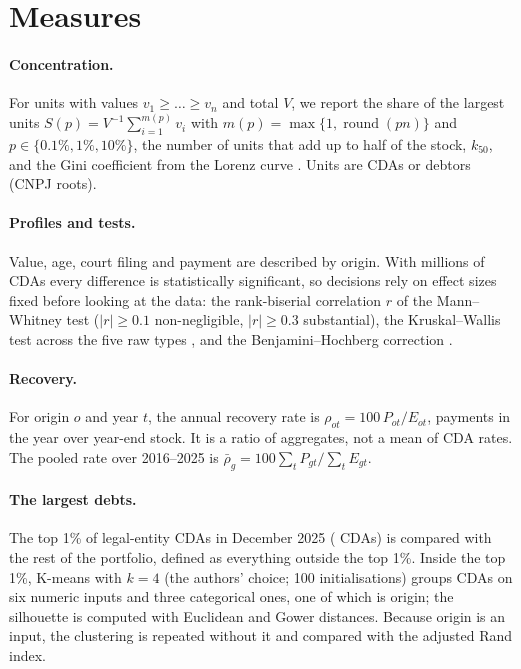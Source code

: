 \section{Measures}\label{sec:method}

\paragraph{Concentration.}
For units with values $v_1 \ge \dots \ge v_n$ and total $V$, we report the share of the largest units $S(p)=V^{-1}\sum_{i=1}^{m(p)} v_i$ with $m(p)=\max\{1,\operatorname{round}(pn)\}$ and $p\in\{0.1\%,1\%,10\%\}$, the number of units that add up to half of the stock, $k_{50}$, and the Gini coefficient from the Lorenz curve \citep{lorenz1905}.
Units are CDAs or debtors (CNPJ roots).

\paragraph{Profiles and tests.}
Value, age, court filing and payment are described by origin.
With millions of CDAs every difference is statistically significant, so decisions rely on effect sizes fixed before looking at the data: the rank-biserial correlation $r$ of the Mann--Whitney test \citep{mann1947,kerby2014} ($|r|\ge 0.1$ non-negligible, $|r|\ge 0.3$ substantial), the Kruskal--Wallis test across the five raw types \citep{kruskal1952}, and the Benjamini--Hochberg correction \citep{benjamini1995}.

\paragraph{Recovery.}
For origin $o$ and year $t$, the annual recovery rate is $\rho_{ot}=100\,P_{ot}/E_{ot}$, payments in the year over year-end stock.
It is a ratio of aggregates, not a mean of CDA rates.
The pooled rate over 2016--2025 is $\bar\rho_g = 100\sum_t P_{gt}/\sum_t E_{gt}$.

\paragraph{The largest debts.}
The top 1\% of legal-entity CDAs in December 2025 (\topOneNCda{} CDAs) is compared with the rest of the portfolio, defined as everything outside the top 1\%.
Inside the top 1\%, K-means \citep{lloyd1982} with $k=4$ (the authors' choice; 100 initialisations) groups CDAs on six numeric inputs and three categorical ones, one of which is origin; the silhouette \citep{rousseeuw1987} is computed with Euclidean and Gower \citep{gower1971} distances.
Because origin is an input, the clustering is repeated without it and compared with the adjusted Rand index.

